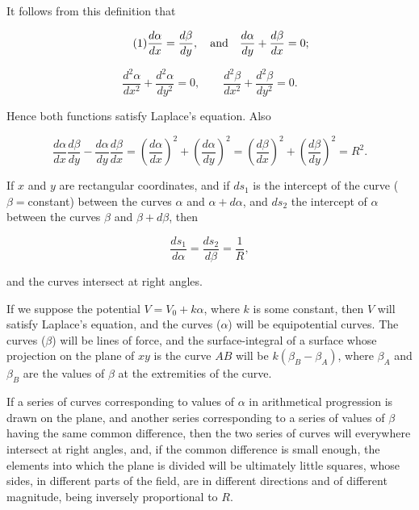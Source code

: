 \documentclass[11pt,a4paper]{article}
\begin{document}
It follows from this definition that

\begin{equation}\tag{1}
\frac{d\alpha}{dx}=\frac{d\beta}{dy},
\quad \hbox{and}\quad
\frac{d\alpha}{dy}+\frac{d\beta}{dx}=0;
\end{equation}

\begin{equation}\tag{2}
\frac{d^2\alpha}{dx^2}+\frac{d^2\alpha}{dy^2}=0,
\qquad
\frac{d^2\beta}{dx^2}+\frac{d^2\beta}{dy^2}=0.
\end{equation}

Hence both functions satisfy Laplace's equation. Also

\begin{equation}\tag{3}
\frac{d\alpha}{dx}\frac{d\beta}{dy}
-\frac{d\alpha}{dy}\frac{d\beta}{dx}
=\left(\frac{d\alpha}{dx}\right)^2
 +\left(\frac{d\alpha}{dy}\right)^2
=\left(\frac{d\beta}{dx}\right)^2
 +\left(\frac{d\beta}{dy}\right)^2
=R^2.
\end{equation}

If $x$ and $y$ are rectangular coordinates, and if $ds_1$ is the intercept of the curve ($\beta={}$constant) between the curves $\alpha$ and $\alpha+d\alpha$, and $ds_2$ the intercept of $\alpha$ between the curves $\beta$ and $\beta+d\beta$, then

\begin{equation}\tag{4}
\frac{ds_1}{d\alpha}=\frac{ds_2}{d\beta}=\frac{1}{R},
\end{equation}

and the curves intersect at right angles.

If we suppose the potential $V=V_0+k\alpha$, where $k$ is some constant, then $V$ will satisfy Laplace's equation, and the curves ($\alpha$) will be equipotential curves. The curves ($\beta$) will be lines of force, and the surface-integral of a surface whose projection on the plane of $xy$ is the curve $AB$ will be $k(\beta_B-\beta_A)$, where $\beta_A$ and $\beta_B$ are the values of $\beta$ at the extremities of the curve.

If a series of curves corresponding to values of $\alpha$ in arithmetical progression is drawn on the plane, and another series corresponding to a series of values of $\beta$ having the same common difference, then the two series of curves will everywhere intersect at right angles, and, if the common difference is small enough, the elements into which the plane is divided will be ultimately little squares, whose sides, in different parts of the field, are in different directions and of different magnitude, being inversely proportional to $R$.
\end{document}
